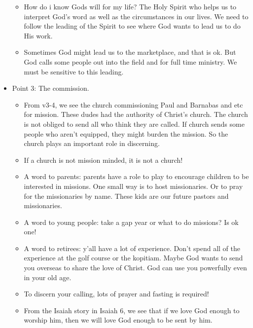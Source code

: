 \begin{itemize}
{\begin{itemize}
    \item{How do i know Gods will for my life?  The Holy Spirit who helps us
    to interpret God’s word as well as the circumstances in our lives.  We
    need to follow the leading of the Spirit to see where God wants to lead
    us to do His work.}
    \item{Sometimes God might lead us to the marketplace, and that is ok. But God calls some people out into the field and for full time ministry. We must be sensitive to this leading.}
  \end{itemize} }
  \item{Point 3: The commission.
  \begin{itemize}
    \item{From v3-4, we see the church commissioning Paul and Barnabas and
    etc for mission.  These dudes had the authority of Christ’s church.  The
    church is not obliged to send all who think they are called.  If church
    sends some people who aren’t equipped, they might burden the mission.  So
    the church plays an important role in discerning.}
    \item{If a church is not mission minded, it is not a church!}
    \item{A word to parents: parents have a role to play to encourage children to be interested in missions. One small way is to host missionaries. Or to pray for the missionaries by name. These kids are our future pastors and missionaries.}
    \item{A word to young people: take a gap year or what to do missions? Is ok one!}
    \item{A word to retirees: y’all have a lot of experience. Don’t spend all of the experience at the golf course or the kopitiam. Maybe God wants to send you overseas to share the love of Christ. God can use you powerfully even in your old age.}
    \item{To discern your calling, lots of prayer and fasting is required!}
    \item{From the Isaiah story in Isaiah 6, we see that if we love God enough to worship him, then we will love God enough to be sent by him.}
  \end{itemize}
  }
\end{itemize}